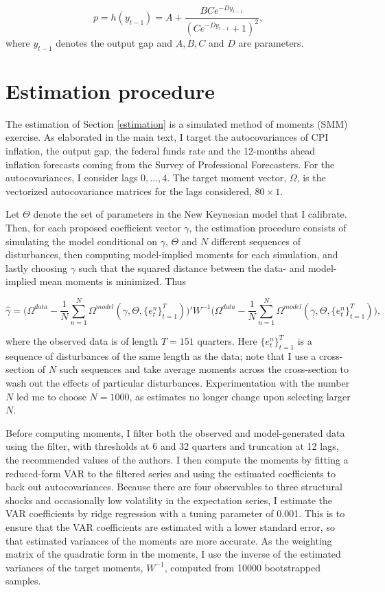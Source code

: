 \documentclass[11pt]{article}
\renewcommand{\[}{\begin{equation}}
\renewcommand{\]}{\end{equation}}
\begin{document}
\begin{equation}
 p = h(y_{t-1}) = A + \frac{B C e^{-D y_{t-1}}}{( C e^{-D y_{t-1}}+1)^2},
\end{equation}
where $y_{t-1}$ denotes the output gap and $A,B,C$ and $D$ are parameters.

\section{Estimation procedure}\label{SMM}
The estimation of Section \ref{estimation} is a simulated method of moments (SMM) exercise. As elaborated in the main text, I target the autocovariances of CPI inflation, the output gap, the federal funds rate and the 12-months ahead inflation forecasts coming from the Survey of Professional Forecasters. For the autocovariances, I consider lags $0, \dots, 4$. The target moment vector, $\Omega$, is the vectorized autocovariance matrices for the lags considered, $80\times1$. 

Let $\Theta$ denote the set of parameters in the New Keynesian model that I calibrate. Then, for each proposed coefficient vector $\gamma$, the estimation procedure consists of simulating the model conditional on $\gamma$, $\Theta$ and $N$ different sequences of disturbances, then computing model-implied moments for each simulation, and lastly choosing $\gamma$ such that the squared distance between the data- and model-implied mean moments is minimized. Thus

\begin{equation}
\hat{\gamma} = \bigg(\Omega^{data}-\frac{1}{N}\sum_{n=1}^N\Omega^{model}(\gamma, \Theta, \{e^n_t\}_{t=1}^{T})\bigg)' W^{-1} \bigg(\Omega^{data}-\frac{1}{N}\sum_{n=1}^N\Omega^{model}(\gamma, \Theta,  \{e^n_t\}_{t=1}^{T})\bigg),
\label{GMM_loss}
\end{equation}

where the observed data is of length $T=151$ quarters. Here $\{e^n_t\}_{t=1}^{T}$ is a sequence of disturbances of the same length as the data; note that I use a cross-section of $N$ such sequences and take average moments across the cross-section to wash out the effects of particular disturbances. Experimentation with the number $N$ led me to choose $N=1000$, as estimates no longer change upon selecting larger $N$.

Before computing moments, I filter both the observed and model-generated data using the \cite{baxter1999measuring} filter, with thresholds at 6 and 32 quarters and truncation at 12 lags, the recommended values of the authors. I then compute the moments by fitting a reduced-form VAR to the filtered series and using the estimated coefficients to back out autocovariances.  Because there are four observables to three structural shocks and occasionally low volatility in the expectation series, I estimate the VAR coefficients by ridge regression with a tuning parameter of 0.001. This is to ensure that the VAR coefficients are estimated with a lower standard error, so that estimated variances of the moments are more accurate. As the weighting matrix of the quadratic form in the moments, I use the inverse of the estimated variances of the target moments, $W^{-1}$, computed from 10000 bootstrapped samples.  
\end{document}
